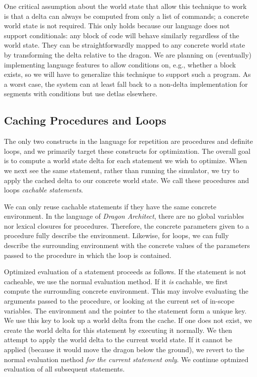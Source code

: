 \documentclass{sig-alternate}
\newcommand{\da}{\emph{Dragon Architect}}
\begin{document}
One critical assumption about the world state that allow this technique to work is that a delta can always be computed from only a list of commands; a concrete world state is not required. This only holds because our language does not support conditionals: any block of code will behave similarly regardless of the world state. They can be straightforwardly mapped to any concrete world state by transforming the delta relative to the dragon. We are planning on (eventually) implementing language features to allow conditions on, e.g., whether a block exists, so we will have to generalize this technique to support such a program. As a worst case, the system can at least fall back to a non-delta implementation for segments with conditions but use detlas elsewhere.

\subsection{Caching Procedures and Loops}

The only two constructs in the language for repetition are procedures and definite loops, and we primarily target these constructs for optimization. The overall goal is to compute a world state delta for each statement we wish to optimize. When we next see the same statement, rather than running the simulator, we try to apply the cached delta to our concrete world state. We call these procedures and loops \emph{cachable statements}.

We can only reuse cachable statements if they have the same concrete environment. In the language of \da{}, there are no global variables nor lexical closures for procedures. Therefore, the concrete parameters given to a procedure fully describe the environment. Likewise, for loops, we can fully describe the surrounding environment with the concrete values of the parameters passed to the procedure in which the loop is contained.

Optimized evaluation of a statement proceeds as follows. If the statement is not cacheable, we use the normal evaluation method. If it \emph{is} cachable, we first compute the surrounding concrete environment. This may involve evaluating the arguments passed to the procedure, or looking at the current set of in-scope variables. The environment and the pointer to the statement form a unique key. We use this key to look up a world delta from the cache. If one does not exist, we create the world delta for this statement by executing it normally. We then attempt to apply the world delta to the current world state. If it cannot be applied (because it would move the dragon below the ground), we revert to the normal evaluation method \emph{for the current statement only}. We continue optmized evaluation of all subsequent statements. 
\end{document}
